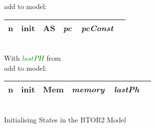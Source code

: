 \begin{algorithm}
    add to model:\\
    \begin{tabular}[h]{>{\ttfamily\color{UniRed}}r >{\ttfamily}l >{\ttfamily\color{UniGrey}}l >{\slshape\color{UniRed}}l >{\slshape} l}
        \hline
        \hline
        \ttfamily
        n & init & AS & pc\ \ pcConst & \\
        \hline
        \hline
    \end{tabular}\\
    \BlankLine
    \BlankLine
    With \textcolor{Green}{$lastPH$} from \\
    add to model:\\
    \begin{tabular}[h]{>{\ttfamily\color{UniRed}}r >{\ttfamily}l >{\ttfamily\color{UniGrey}}l >{\slshape\color{UniRed}}l >{\slshape} l}
        \hline
        \hline
        \ttfamily
        n & init & Mem & memory\ \ \color{Green}lastPh & \\
        \hline
        \hline
    \end{tabular}\\
    \caption[Initialising States]{Initialising States in the BTOR2 Model}\label{alg:initstate}
\end{algorithm}